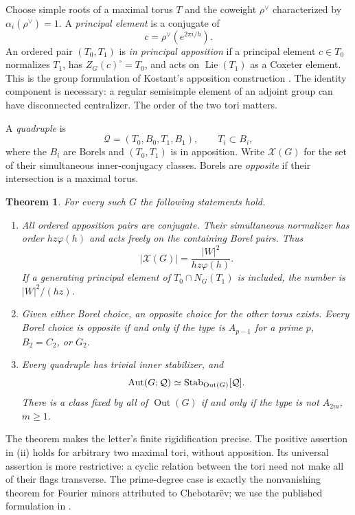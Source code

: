 \documentclass[11pt]{article}
\newcommand{\Out}{\operatorname{Out}}\newcommand{\Inn}{\operatorname{Inn}}
\newcommand{\Lie}{\operatorname{Lie}}\newcommand{\GL}{\operatorname{GL}}
\newcommand{\Stab}{\operatorname{Stab}}\newcommand{\id}{\mathrm{id}}
\newtheorem{theorem}{Theorem}[section]
\theoremstyle{definition}\newtheorem{definition}[theorem]{Definition}
\theoremstyle{remark}\newtheorem{remark}[theorem]{Remark}
\begin{document}
Choose simple roots of a maximal torus $T$ and the coweight $\rho^\vee$ characterized by $\alpha_i(\rho^\vee)=1$. A \emph{principal element} is a conjugate of
\[
 c=\rho^\vee(e^{2\pi i/h}).
\]
An ordered pair $(T_0,T_1)$ is \emph{in principal apposition} if a principal element $c\in T_0$ normalizes $T_1$, has $Z_G(c)^\circ=T_0$, and acts on $\Lie(T_1)$ as a Coxeter element. This is the group formulation of Kostant's apposition construction \citep[Theorems~1.2--1.3, pp.~6; principal-element paragraph, p.~7; Proposition~1.8 and Theorem~1.9, p.~8]{Kostant2010}. The identity component is necessary: a regular semisimple element of an adjoint group can have disconnected centralizer. The order of the two tori matters.

A \emph{quadruple} is
\[
 \mathcal Q=(T_0,B_0,T_1,B_1),\qquad T_i\subset B_i,
\]
where the $B_i$ are Borels and $(T_0,T_1)$ is in apposition. Write $\mathcal X(G)$ for the set of their simultaneous inner-conjugacy classes. Borels are \emph{opposite} if their intersection is a maximal torus.

\begin{theorem}\label{thm:main}
For every such $G$ the following statements hold.
\begin{enumerate}[label=\textup{(\roman*)}]
\item All ordered apposition pairs are conjugate. Their simultaneous normalizer has order $hz\varphi(h)$ and acts freely on the containing Borel pairs. Thus
\[
 |\mathcal X(G)|=\frac{|W|^2}{hz\varphi(h)}.
\]
If a generating principal element of $T_0\cap N_G(T_1)$ is included, the number is $|W|^2/(hz)$.
\item Given either Borel choice, an opposite choice for the other torus exists. Every Borel choice is opposite if and only if the type is $A_{p-1}$ for a prime $p$, $B_2=C_2$, or $G_2$.
\item Every quadruple has trivial inner stabilizer, and
\[
 \Aut(G;\mathcal Q)\simeq\Stab_{\Out(G)}[\mathcal Q].
\]
There is a class fixed by all of $\Out(G)$ if and only if the type is not $A_{2m}$, $m\geq1$.
\end{enumerate}
\end{theorem}

The theorem makes the letter's finite rigidification precise. The positive assertion in (ii) holds for arbitrary two maximal tori, without apposition. Its universal assertion is more restrictive: a cyclic relation between the tori need not make all of their flags transverse. The prime-degree case is exactly the nonvanishing theorem for Fourier minors attributed to Chebotar\"ev; we use the published formulation in \citet[Lemma~1.3, p.~123]{Tao2005}.
\end{document}
